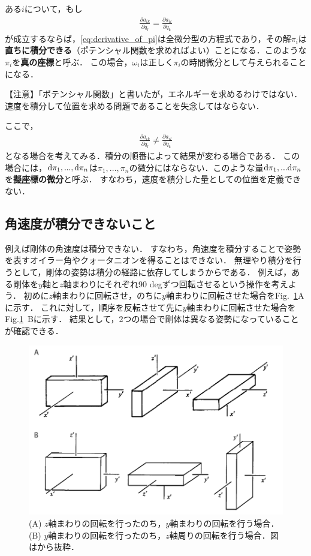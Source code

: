 \documentclass[a4j,10pt]{jsarticle}
\newcommand{\henbbn}[2]{\frac{\partial #1}{\partial #2}}
\begin{document}
ある$i$について，もし
\begin{align}
    \frac{\partial a_{ik}}{\partial q_l}=\frac{\partial a_{il}}{\partial q_k}
\end{align}
が成立するならば，\eqref{eq:derivative_of_pi}は全微分型の方程式であり，その解$\pi_i$は\textbf{直ちに積分できる}（ポテンシャル関数を求めればよい）ことになる．このような$\pi_i$を\textbf{真の座標}と呼ぶ．
この場合，$\omega_i$は正しく$\pi_i$の時間微分として与えられることになる．

【注意】「ポテンシャル関数」と書いたが，エネルギーを求めるわけではない．速度を積分して位置を求める問題であることを失念してはならない．

ここで，
\begin{align}
    \henbbn{a_{ik}}{q_l}\neq\henbbn{a_{il}}{q_k}
\end{align}
となる場合を考えてみる．積分の順番によって結果が変わる場合である．
この場合には，${\rm d} \pi_1,...,{\rm d} \pi_n$は$\pi_1,...,\pi_n$の微分にはならない．このような量${\rm d} \pi_1,...{\rm d} \pi_n$を\textbf{擬座標の微分}と呼ぶ．
すなわち，速度を積分した量としての位置を定義できない．

\subsection{角速度が積分できないこと}
例えば剛体の角速度は積分できない．
すなわち，角速度を積分することで姿勢を表すオイラー角やクォータニオンを得ることはできない．
無理やり積分を行うとして，剛体の姿勢は積分の経路に依存してしまうからである．
例えば，ある剛体を$y$軸と$z$軸まわりにそれぞれ90 degずつ回転させるという操作を考えよう．
初めに$z$軸まわりに回転させ，のちに$y$軸まわりに回転させた場合をFig.~\ref{fig:rotation}Aに示す．
これに対して，順序を反転させて先に$y$軸まわりに回転させた場合をFig.\ref{fig:rotation}~Bに示す．
結果として，2つの場合で剛体は異なる姿勢になっていることが確認できる．

\begin{figure}
    \centering
    \includegraphics[width=120mm]{rotation.pdf}
    \caption{(A) $z$軸まわりの回転を行ったのち，$y$軸まわりの回転を行う場合．(B) $y$軸まわりの回転を行ったのち，$z$軸周りの回転を行う場合．図は\cite{Goldstein}から抜粋．}
    \label{fig:rotation}
\end{figure}
\end{document}
